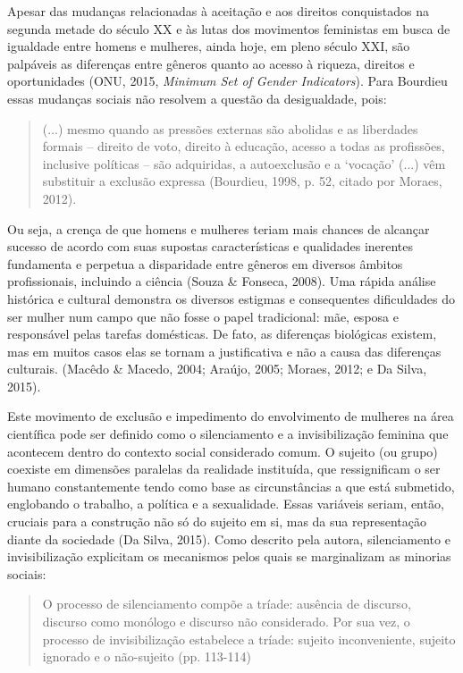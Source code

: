 Apesar das mudanças relacionadas à aceitação e aos direitos conquistados na segunda metade do século XX e às lutas dos movimentos feministas em busca de igualdade entre homens e mulheres, ainda hoje, em pleno século XXI, são palpáveis as diferenças entre gêneros quanto ao acesso à riqueza, direitos e oportunidades (ONU, 2015, \textit{Minimum Set of Gender Indicators}). Para Bourdieu essas mudanças sociais não resolvem a questão da desigualdade, pois:

\begin{quote}
(...) mesmo quando as pressões externas são abolidas e as liberdades formais – direito de voto, direito à educação, acesso a todas as profissões, inclusive políticas – são adquiridas, a autoexclusão e a ‘vocação’ (...) vêm substituir a exclusão expressa (Bourdieu, 1998, p. 52, citado por Moraes, 2012).
\end{quote}

Ou seja, a crença de que homens e mulheres teriam mais chances de alcançar sucesso de acordo com suas supostas características e qualidades inerentes fundamenta e perpetua a disparidade entre gêneros em diversos âmbitos profissionais, incluindo a ciência (Souza \& Fonseca, 2008). Uma rápida análise histórica e cultural demonstra os diversos estigmas e consequentes dificuldades do ser mulher num campo que não fosse o papel tradicional: mãe, esposa e responsável pelas tarefas domésticas. De fato, as diferenças biológicas existem, mas em muitos casos elas se tornam a justificativa e não a causa das diferenças culturais. (Macêdo \& Macedo, 2004; Araújo, 2005; Moraes, 2012; e Da Silva, 2015).

Este movimento de exclusão e impedimento do envolvimento de mulheres na área científica pode ser definido como o silenciamento e a invisibilização feminina que acontecem dentro do contexto social considerado comum. O sujeito (ou grupo) coexiste em dimensões paralelas da realidade instituída, que ressignificam o ser humano constantemente tendo como base as circunstâncias a que está submetido, englobando o trabalho, a política e a sexualidade. Essas variáveis seriam, então, cruciais para a construção não só do sujeito em si, mas da sua representação diante da sociedade (Da Silva, 2015). Como descrito pela autora, silenciamento e invisibilização explicitam os mecanismos pelos quais se marginalizam as minorias sociais:

\begin{quote}
O processo de silenciamento compõe a tríade: ausência de discurso, discurso como monólogo e discurso não considerado. Por sua vez, o processo de invisibilização estabelece a tríade: sujeito inconveniente, sujeito ignorado e o não-sujeito (pp. 113-114)
\end{quote}

